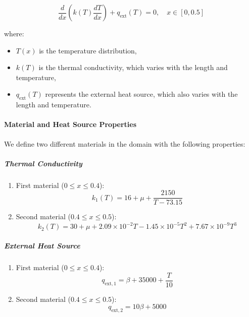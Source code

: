 \documentclass{article}
\begin{document}
	\begin{equation}
		\frac{d}{dx} \left( k(T) \frac{dT}{dx} \right) + q_{\text{ext}}(T) = 0, \quad x \in [0, 0.5]
	\end{equation}
	
	where:
	\begin{itemize}
		\item \( T(x) \) is the temperature distribution,
		\item \( k(T) \) is the thermal conductivity, which varies with the length and temperature,
		\item \( q_{\text{ext}}(T) \) represents the external heat source, which also varies with the length and temperature.
	\end{itemize}
	
	\paragraph{Material and Heat Source Properties}
	We define two different materials in the domain with the following properties:
	
	\subparagraph{Thermal Conductivity}
	\begin{enumerate}
		\item First material ($0\leq x\leq0.4$):
		\begin{equation}
			k_1(T) = 16 + \mu + \frac{2150}{T - 73.15}
		\end{equation}
		\item Second material ($0.4\leq x\leq0.5$):
		\begin{equation}
			k_2(T) = 30 + \mu + 2.09 \times 10^{-2} T - 1.45 \times 10^{-5} T^2 + 7.67 \times 10^{-9} T^3
		\end{equation}
	\end{enumerate}
	
	\subparagraph{External Heat Source}
	\begin{enumerate}
		\item First material ($0\leq x\leq0.4$):
		\begin{equation}
			q_{\text{ext},1} = \beta + 35000 + \frac{T}{10}
		\end{equation}
		\item Second material ($0.4\leq x\leq0.5$):
		\begin{equation}
			q_{\text{ext},2} = 10\beta + 5000
		\end{equation}
	\end{enumerate}
	
\end{document}

